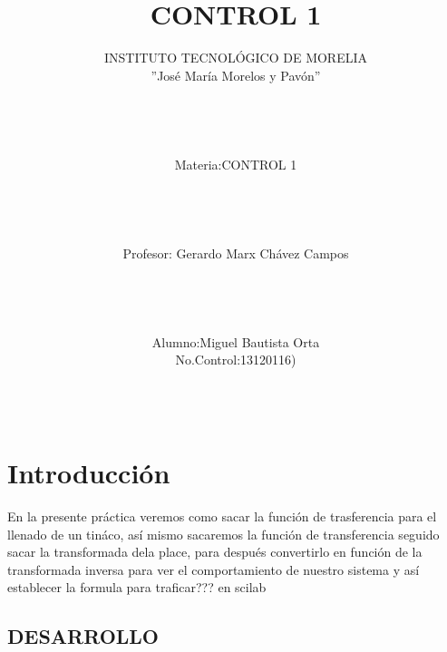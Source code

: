\documentclass[12pt]{article}
\title{CONTROL 1}
\author{INSTITUTO TECNOLÓGICO DE MORELIA\\''José María Morelos y Pavón''\\ \\ \\ \\ \\Materia:CONTROL 1\\ \\ \\ \\ \\Profesor: Gerardo Marx Chávez Campos\\ \\ \\ \\ \\Alumno:Miguel Bautista Orta\\No.Control:13120116)\\\\\\}
\begin{document}
\maketitle
\section{Introducción}
En la presente práctica veremos como sacar la función de trasferencia para el llenado de un tináco, así mismo sacaremos la función de transferencia seguido  sacar la transformada dela place, para después convertirlo en función de la transformada inversa para ver el comportamiento de nuestro sistema y así establecer la formula para traficar??? en scilab

\subsection{DESARROLLO}
\end{document}
